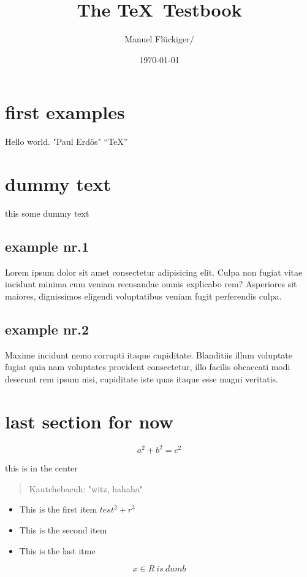 \documentclass{article}
\author{Manuel Flückiger/}
\title{The \TeX\ Testbook}
\date{\today}
\begin{document}
\maketitle
\section {first examples}
Hello world.
"Paul Erd\"os" \newline
``TeX''
\section {dummy text}
this some dummy text
\subsection{example nr.1}
Lorem ipsum dolor sit amet consectetur adipisicing elit. Culpa non fugiat vitae incidunt minima cum veniam recusandae omnis explicabo rem? Asperiores sit maiores, dignissimos eligendi voluptatibus veniam fugit perferendis culpa.
\subsection{example nr.2}
Maxime incidunt nemo corrupti itaque cupiditate. Blanditiis illum voluptate fugiat quia nam voluptates provident consectetur, illo facilis obcaecati modi deserunt rem ipsum nisi, cupiditate iste quas itaque esse magni veritatis.
\section{last section for now}
\[
a^2 + b^2 = c^2
\]
\begin{center} this is in the center \end{center}

\begin{quote} Kautchebacuh: "witz, hahaha" \end{quote}

\begin{itemize}
\item This is the first item $test^2 + r^3$
\item This is the second item
\item This is the last itme
\end{itemize}

\begin{equation} x \in R\ is\ dumb \end{equation}
\end{document}
